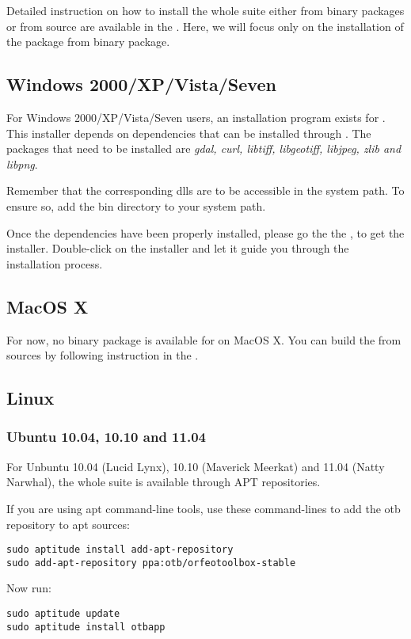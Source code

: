 Detailed instruction on how to install the whole \otb suite either
from binary packages or from source are available in the \sg. Here, we
will focus only on the installation of the \app package from binary
package.

\subsection{Windows 2000/XP/Vista/Seven}
\label{ssec:app_windows_binaries}

For Windows 2000/XP/Vista/Seven users, an installation program exists
for \app. This installer depends on dependencies that can
be installed through \osgeow. The packages that need to be installed
are \emph{gdal, curl, libtiff, libgeotiff, libjpeg, zlib and libpng}.

Remember that the corresponding dlls are to be accessible in the
system path. To ensure so, add the \osgeow bin directory to your
system path.

 Once the dependencies have been properly installed, please go the the
 \download, to get the installer. Double-click on the installer and
 let it guide you through the installation process.

\subsection{MacOS X}
\label{ssec:mac_binaries}

For now, no binary package is available for \app on MacOS X. You can
build the \app from sources by following instruction in the \sg.

\subsection{Linux}

\subsubsection{Ubuntu 10.04, 10.10 and 11.04}
\label{ssec:ubuntu_binaries}
For Unbuntu 10.04 (Lucid Lynx), 10.10 (Maverick Meerkat) and 11.04
(Natty Narwhal), the whole \otb suite is available through APT repositories.

If you are using apt command-line tools, use these command-lines to
add the otb repository to apt sources:
\begin{verbatim}
sudo aptitude install add-apt-repository 
sudo add-apt-repository ppa:otb/orfeotoolbox-stable
\end{verbatim}
Now run:
\begin{verbatim}
sudo aptitude update
sudo aptitude install otbapp
\end{verbatim}


